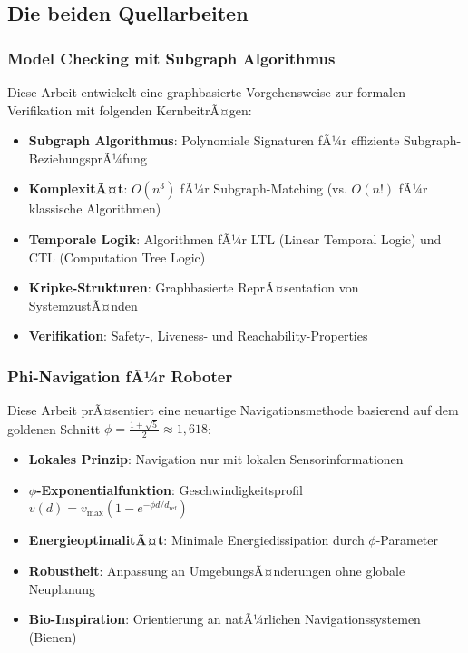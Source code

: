 ﻿\documentclass[a4paper,12pt]{article}
\theoremstyle{definition}
\begin{document}
\subsection{Die beiden Quellarbeiten}

\subsubsection{Model Checking mit Subgraph Algorithmus}

Diese Arbeit entwickelt eine graphbasierte Vorgehensweise zur formalen Verifikation mit folgenden KernbeitrÃ¤gen:

\begin{itemize}
	\item \textbf{Subgraph Algorithmus}: Polynomiale Signaturen fÃ¼r effiziente Subgraph-Bezie\-hungsprÃ¼fung
	\item \textbf{KomplexitÃ¤t}: $O(n^3)$ fÃ¼r Subgraph-Matching (vs. $O(n!)$ fÃ¼r klassische Algorithmen)
	\item \textbf{Temporale Logik}: Algorithmen fÃ¼r LTL (Linear Temporal Logic) und CTL (Computation Tree Logic)
	\item \textbf{Kripke-Strukturen}: Graphbasierte ReprÃ¤sentation von SystemzustÃ¤nden
	\item \textbf{Verifikation}: Safety-, Liveness- und Reachability-Properties
\end{itemize}

\subsubsection{Phi-Navigation fÃ¼r Roboter}

Diese Arbeit prÃ¤sentiert eine neuartige Navigationsmethode basierend auf dem goldenen Schnitt $\phi = \frac{1+\sqrt{5}}{2} \approx 1{,}618$:

\begin{itemize}
	\item \textbf{Lokales Prinzip}: Navigation nur mit lokalen Sensorinformationen
	\item \textbf{$\phi$-Exponentialfunktion}: Geschwindigkeitsprofil $v(d) = v_{\max}(1 - e^{-\phi d/d_{\text{ref}}})$
	\item \textbf{EnergieoptimalitÃ¤t}: Minimale Energiedissipation durch $\phi$-Parameter
	\item \textbf{Robustheit}: Anpassung an UmgebungsÃ¤nderungen ohne globale Neuplanung
	\item \textbf{Bio-Inspiration}: Orientierung an natÃ¼rlichen Navigationssystemen (Bienen)
\end{itemize}
\end{document}
